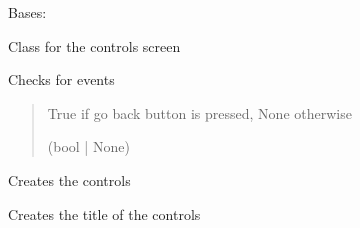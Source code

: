 \documentclass[letterpaper,10pt,english]{sphinxmanual}
\begin{document}
\begin{fulllineitems}
\label{\detokenize{controls:controls.Controls}}
\pysigstartsignatures
{}
\pysigstopsignatures
\sphinxAtStartPar
Bases: 

\sphinxAtStartPar
Class for the controls screen

\begin{fulllineitems}
\label{\detokenize{controls:controls.Controls.check_events}}
\pysigstartsignatures
{}
\pysigstopsignatures
\sphinxAtStartPar
Checks for events
\begin{quote}\begin{description}
\sphinxAtStartPar
True if go back button is pressed, None otherwise

\sphinxAtStartPar
(bool | None)

\end{description}\end{quote}

\end{fulllineitems}


\begin{fulllineitems}
\label{\detokenize{controls:controls.Controls.create_controls}}
\pysigstartsignatures
{}
\pysigstopsignatures
\sphinxAtStartPar
Creates the controls

\end{fulllineitems}


\begin{fulllineitems}
\label{\detokenize{controls:controls.Controls.create_title}}
\pysigstartsignatures
{}
\pysigstopsignatures
\sphinxAtStartPar
Creates the title of the controls


\end{fulllineitems}
\end{fulllineitems}
\end{document}

